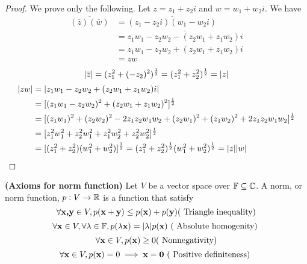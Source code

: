 \documentclass{report}
\begin{document}
\begin{proof}
We prove only the following. Let $z=z_1+z_2i$ and $w=w_1+w_2i$. We have
 \begin{align}
   \overline{(\overline{z})(\overline{w})}&=\overline{(z_1-z_2i)(w_1-w_2i)}\\
   &=\overline{z_1w_1-z_2w_2-(z_2w_1+z_1w_2)i}\\
   &=z_1w_1-z_2w_2+(z_2w_1+z_1w_2)i\\
   &=zw
\end{align}
\begin{equation}
|\overline{z}|=(z_1^2+(-z_2)^2)^{\frac{1}{2}}=(z_1^2+z_2^2)^{\frac{1}{2}}=|z|
\end{equation}
\begin{align}
|zw|&=|z_1w_1-z_2w_2+(z_2w_1+z_1w_2)i|\\
&=[(z_1w_1-z_2w_2)^2+(z_2w_1+z_1w_2)^2]^{\frac{1}{2}}\\
&=[(z_1w_1)^2+(z_2w_2)^2-2z_1z_2w_1w_2+(z_2w_1)^2+(z_1w_2)^2+2z_1z_2w_1w_2]^{\frac{1}{2}}\\
&=[z_1^2w_1^2+z_2^2w_1^2+z_1^2w_2^2+z_2^2w_2^2]^{\frac{1}{2}}\\
&=[(z_1^2+z_2^2)(w_1^2+w_2^2)]^{\frac{1}{2}}=(z_1^2+z_2^2)^{\frac{1}{2}}(w_1^2+w_2^2)^{\frac{1}{2}}=|z||w|
\end{align}
\end{proof}
\begin{axiom}
\label{1.6.4}
\textbf{(Axioms for norm function)} Let $V$ be a vector space over  $\mathbb{F}\subseteq\mathbb{C}$. A norm, or norm function, $p:V\rightarrow \mathbb{R}$ is a function that satisfy 
\begin{equation}
  \forall \textbf{x,y}\in V, p(\textbf{x}+\textbf{y})\leq p(\textbf{x})+p(\textbf{y})  \text{( Triangle inequality)}
\end{equation}
\begin{equation}
\forall \textbf{x}\in V,\forall \lambda\in\mathbb{F}, p(\lambda\textbf{x})=|\lambda|p(\textbf{x})\text{ ( Absolute homogenity) }
\end{equation}
\begin{equation}
\forall \textbf{x}\in V,p(\textbf{x})\geq 0\text{( Nonnegativity)}
\end{equation}
\begin{equation}
\forall \textbf{x}\in V, p(\textbf{x})=0\implies \textbf{x}=\textbf{0} \text{ ( Positive definiteness) }
\end{equation}

\end{axiom}
\end{document}
